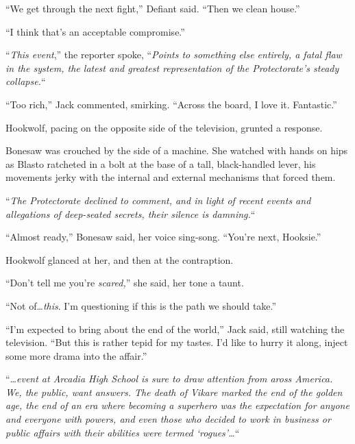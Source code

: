``We get through the next fight,'' Defiant said.  ``Then we clean house.''



``I think that's an acceptable compromise.''



\sectionbreak



``\emph{This event},'' the reporter spoke, ``\emph{Points to something else entirely, a fatal flaw in the system, the latest and greatest representation of the Protectorate's steady collapse.}``



``Too rich,'' Jack commented, smirking.  ``Across the board, I love it.  Fantastic.''



Hookwolf, pacing on the opposite side of the television, grunted a response.



Bonesaw was crouched by the side of a machine.  She watched with hands on hips as Blasto ratcheted in a bolt at the base of a tall, black-handled lever, his movements jerky with the internal and external mechanisms that forced them.



``\emph{The Protectorate declined to comment, and in light of recent events and allegations of deep-seated secrets, their silence is damning.}``



``Almost ready,'' Bonesaw said, her voice sing-song.  ``You're next, Hooksie.''



Hookwolf glanced at her, and then at the contraption.



``Don't tell me you're \emph{scared,}'' she said, her tone a taunt.



``Not of\ldots \emph{this}.  I'm questioning if this is the path we should take.''



``I'm expected to bring about the end of the world,'' Jack said, still watching the television.  ``But this is rather tepid for my tastes.  I'd like to hurry it along, inject some more drama into the affair.''



``\ldots\emph{event at Arcadia High School is sure to draw attention from aross America.  We, the public, want answers.  The death of Vikare marked the end of the golden age, the end of an era where becoming a superhero was the expectation for anyone and everyone with powers, and even those who decided to work in business or public affairs with their abilities were termed `rogues'\ldots}``



